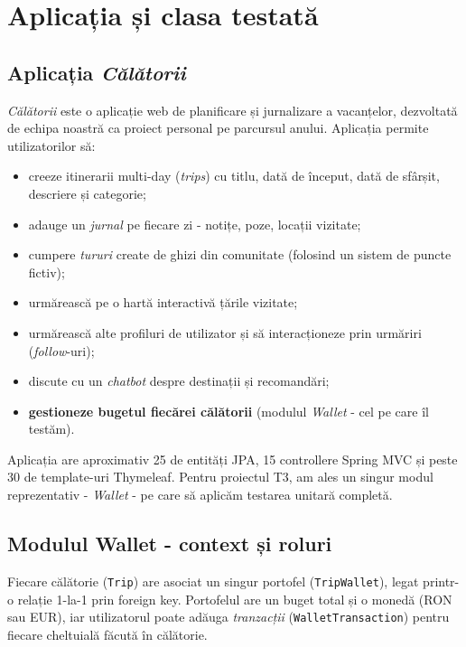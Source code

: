 \chapter{Aplicația și clasa testată}
\label{ch:aplicatia}

\section{Aplicația \textit{Călătorii}}

\textit{Călătorii} este o aplicație web de planificare și jurnalizare a vacanțelor, dezvoltată de echipa noastră ca proiect personal pe parcursul anului. Aplicația permite utilizatorilor să:

\begin{itemize}
    \item creeze itinerarii multi-day (\textit{trips}) cu titlu, dată de început, dată de sfârșit, descriere și categorie;
    \item adauge un \textit{jurnal} pe fiecare zi - notițe, poze, locații vizitate;
    \item cumpere \textit{tururi} create de ghizi din comunitate (folosind un sistem de puncte fictiv);
    \item urmărească pe o hartă interactivă țările vizitate;
    \item urmărească alte profiluri de utilizator și să interacționeze prin urmăriri (\textit{follow}-uri);
    \item discute cu un \textit{chatbot} despre destinații și recomandări;
    \item \textbf{gestioneze bugetul fiecărei călătorii} (modulul \textit{Wallet} - cel pe care îl testăm).
\end{itemize}

Aplicația are aproximativ 25 de entități JPA, 15 controllere Spring MVC și peste 30 de template-uri Thymeleaf. Pentru proiectul T3, am ales un singur modul reprezentativ - \textit{Wallet} - pe care să aplicăm testarea unitară completă.

\section{Modulul Wallet - context și roluri}

Fiecare călătorie (\texttt{Trip}) are asociat un singur portofel (\texttt{TripWallet}), legat printr-o relație 1-la-1 prin foreign key. Portofelul are un buget total și o monedă (RON sau EUR), iar utilizatorul poate adăuga \textit{tranzacții} (\texttt{WalletTransaction}) pentru fiecare cheltuială făcută în călătorie.

